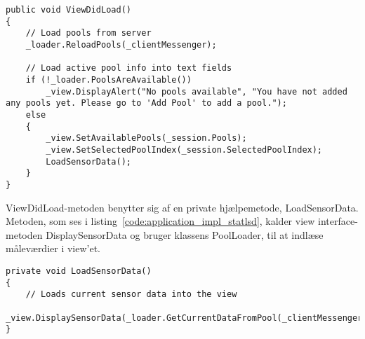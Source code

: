\begin{lstlisting}[caption={ViewDidLoad() in StatViewController},label={code:application_impl_vdlstat}]
public void ViewDidLoad()
{
	// Load pools from server
	_loader.ReloadPools(_clientMessenger);

	// Load active pool info into text fields
	if (!_loader.PoolsAreAvailable())
		_view.DisplayAlert("No pools available", "You have not added any pools yet. Please go to 'Add Pool' to add a pool.");
	else
	{
		_view.SetAvailablePools(_session.Pools);
		_view.SetSelectedPoolIndex(_session.SelectedPoolIndex);
		LoadSensorData();
	}
}
\end{lstlisting}

ViewDidLoad-metoden benytter sig af en private hjælpemetode, LoadSensorData. Metoden, som ses i listing~\ref{code:application_impl_statlsd}, kalder view interface-metoden DisplaySensorData og bruger klassens PoolLoader, til at indlæse måleværdier i view'et.

\begin{lstlisting}[caption={LoadSensorData() in StatViewController},label={code:application_impl_statlsd}]
private void LoadSensorData()
{
	// Loads current sensor data into the view
	_view.DisplaySensorData(_loader.GetCurrentDataFromPool(_clientMessenger));
}
\end{lstlisting}